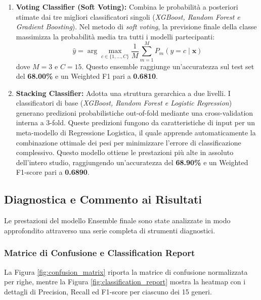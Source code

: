 \begin{enumerate}
    \item \textbf{Voting Classifier (Soft Voting):} Combina le probabilità a posteriori stimate dai tre migliori classificatori singoli (\textit{XGBoost, Random Forest e Gradient Boosting}). Nel metodo di \textit{soft voting}, la previsione finale della classe massimizza la probabilità media tra tutti i modelli partecipanti:
    \begin{equation}
    \hat{y} = \arg\max_{c \in \{1,\dots,C\}} \frac{1}{M} \sum_{m=1}^M P_m(y=c \mid \mathbf{x})
    \label{eq:soft_voting}
    \end{equation}
    dove $M=3$ e $C=15$. Questo ensemble raggiunge un'accuratezza sul test set del \textbf{68.00\%} e un Weighted F1 pari a \textbf{0.6810}.
    
    \item \textbf{Stacking Classifier:} Adotta una struttura gerarchica a due livelli. I classificatori di base (\textit{XGBoost, Random Forest e Logistic Regression}) generano predizioni probabilistiche out-of-fold mediante una cross-validation interna a 3-fold. Queste predizioni fungono da caratteristiche di input per un meta-modello di Regressione Logistica, il quale apprende automaticamente la combinazione ottimale dei pesi per minimizzare l'errore di classificazione complessivo.
    Questo modello ottiene le prestazioni più alte in assoluto dell'intero studio, raggiungendo un'accuratezza del \textbf{68.90\%} e un Weighted F1-score pari a \textbf{0.6890}.
\end{enumerate}

\newpage
\subsection{Diagnostica e Commento ai Risultati}

Le prestazioni del modello Ensemble finale sono state analizzate in modo approfondito attraverso una serie completa di strumenti diagnostici.

\subsubsection{Matrice di Confusione e Classification Report}

La Figura \ref{fig:confusion_matrix} riporta la matrice di confusione normalizzata per righe, mentre la Figura \ref{fig:classification_report} mostra la heatmap con i dettagli di Precision, Recall ed F1-score per ciascuno dei 15 generi.

